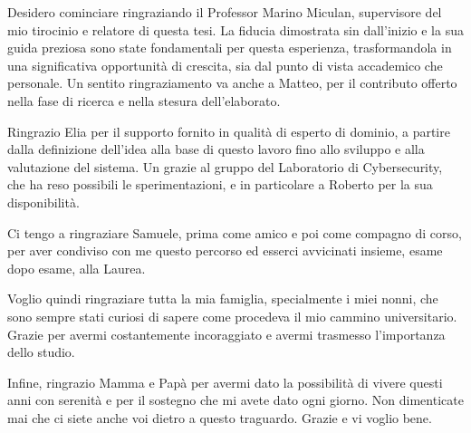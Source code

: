 Desidero cominciare ringraziando il Professor Marino Miculan, supervisore del mio tirocinio e relatore di questa tesi. La fiducia dimostrata sin dall'inizio e la sua guida preziosa sono state fondamentali per questa esperienza, trasformandola in una significativa opportunità di crescita, sia dal punto di vista accademico che personale. Un sentito ringraziamento va anche a Matteo, per il contributo offerto nella fase di ricerca e nella stesura dell'elaborato.

Ringrazio Elia per il supporto fornito in qualità di esperto di dominio, a partire dalla definizione dell'idea alla base di questo lavoro fino allo sviluppo e alla valutazione del sistema. Un grazie al gruppo del Laboratorio di Cybersecurity, che ha reso possibili le sperimentazioni, e in particolare a Roberto per la sua disponibilità.

Ci tengo a ringraziare Samuele, prima come amico e poi come compagno di corso, per aver condiviso con me questo percorso ed esserci avvicinati insieme, esame dopo esame, alla Laurea.

Voglio quindi ringraziare tutta la mia famiglia, specialmente i miei nonni, che sono sempre stati curiosi di sapere come procedeva il mio cammino universitario. Grazie per avermi costantemente incoraggiato e avermi trasmesso l'importanza dello studio. 


Infine, ringrazio Mamma e Papà per avermi dato la possibilità di vivere questi anni con serenità e per il sostegno che mi avete dato ogni giorno. Non dimenticate mai che ci siete anche voi dietro a questo traguardo. Grazie e vi voglio bene.

